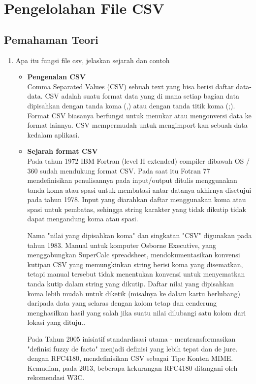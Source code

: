 \chapter{Pengelolahan File CSV}
\section{Pemahaman Teori}
\begin{enumerate}
    \item Apa itu fungsi file csv, jelaskan sejarah dan contoh
    \begin{itemize}
        \item 
        \textbf{Pengenalan CSV} \\
        \hspace*{1cm} Comma Separated Values (CSV) sebuah text yang bisa berisi daftar data-data. CSV adalah suatu format data yang di mana setiap bagian data dipisahkan dengan tanda koma (,) atau dengan tanda titik koma (;). Format CSV biasanya berfungsi untuk menukar atau mengonversi data ke format lainnya. CSV mempermudah untuk mengimport kan sebuah data kedalam aplikasi. 
        \item 
        \textbf{Sejarah format CSV} \\
        \hspace*{1cm}Pada tahun 1972 IBM Fortran (level H extended) compiler dibawah  OS / 360 sudah mendukung format CSV. Pada saat itu Fotran 77 mendefinisikan penulisannya pada input/output ditulis menggunakan tanda koma atau spasi untuk membatasi antar datanya akhirnya disetujui pada tahun 1978. Input yang diarahkan daftar menggunakan koma atau spasi untuk pembatas, sehingga string karakter yang tidak dikutip tidak dapat mengandung koma atau spasi.
        
        \hspace*{1cm}Nama "nilai yang dipisahkan koma" dan singkatan "CSV" digunakan pada tahun 1983. Manual untuk komputer Osborne Executive, yang menggabungkan SuperCalc spreadsheet, mendokumentasikan konvensi kutipan CSV yang memungkinkan string berisi koma yang disematkan, tetapi manual tersebut tidak menentukan konvensi untuk menyematkan tanda kutip dalam string yang dikutip. Daftar nilai yang dipisahkan koma lebih mudah untuk diketik (misalnya ke dalam kartu berlubang) daripada data yang selaras dengan kolom tetap dan cenderung menghasilkan hasil yang salah jika suatu nilai dilubangi satu kolom dari lokasi yang dituju.. 
        
        \hspace*{1cm}Pada Tahun 2005 inisiatif standardisasi utama - mentransformasikan "definisi fuzzy de facto" menjadi definisi yang lebih tepat dan de jure. dengan RFC4180, mendefinisikan CSV sebagai Tipe Konten MIME. Kemudian, pada 2013, beberapa kekurangan RFC4180 ditangani oleh rekomendasi W3C.
        

\end{itemize}
\end{enumerate}
